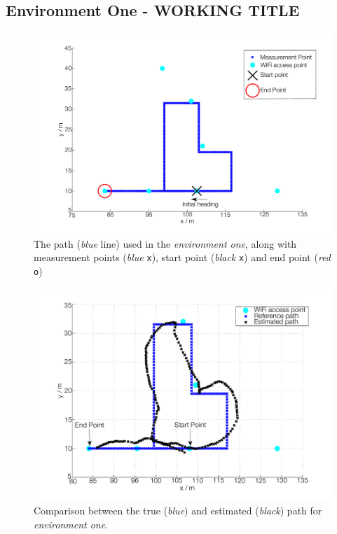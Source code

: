 \documentclass{LTHthesis}
\begin{document}
\subsection{Environment One - WORKING TITLE} 
%

%
\begin{figure}[!hbt]

\includegraphics[width=1\textwidth ]{images/pure_rssi/env_one}
\caption{The path (\emph{blue} line) used in the \emph{environment one}, along with measurement points (\emph{blue} \texttt{x}), start point (\emph{black} \texttt{x}) and end point (\emph{red} \texttt{o}) }\label{env_one}
\end{figure}
%
\begin{figure}[!hbt]

\includegraphics[width=1\textwidth ]{images/pure_rssi/true_vs_est_env_1_05}
\caption{Comparison between the true (\emph{blue}) and estimated (\emph{black}) path for \emph{environment one}.}\label{true_vs_est_env_1_05}
\end{figure}
\end{document}
